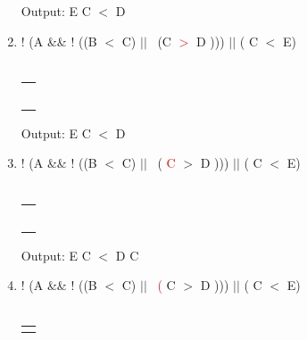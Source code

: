 \documentclass[a4paper]{article}
\begin{document}
\begin{large}
\begin{enumerate}
\begin{tabular}[t]{ | p{1.6em} | }
            \makecell{ $||$ } \\ \hline
          \end{tabular}
          \hspace{2em}
          Output: E C $<$ D
    \item
          ! (A \&\& ! ((B $<$ C) $||$ \ (C  \textcolor{red}{$>$} D ))) $||$ ( C $<$ E)\\
          \\
          \begin{tabular}[t]{ | p{1.6em} | }
            \makecell{ }      \\ \hline
            \makecell{$>$}    \\ \hline
            \makecell{)}      \\ \hline
            \makecell{)}      \\ \hline
            \makecell{)}      \\ \hline
            \makecell{ $||$ } \\ \hline
          \end{tabular}
          \hspace{2em}
          Output: E C $<$ D
    \item
          ! (A \&\& ! ((B $<$ C) $||$ \ (  \textcolor{red}{C} $>$ D ))) $||$ ( C $<$ E)\\
          \\
          \begin{tabular}[t]{ | p{1.6em} | }
            \makecell{ }      \\ \hline
            \makecell{$>$}    \\ \hline
            \makecell{)}      \\ \hline
            \makecell{)}      \\ \hline
            \makecell{)}      \\ \hline
            \makecell{ $||$ } \\ \hline
          \end{tabular}
          \hspace{2em}
          Output: E C $<$ D C
    \item
          ! (A \&\& ! ((B $<$ C) $||$ \ \textcolor{red}{(} C $>$ D ))) $||$ ( C $<$ E)\\
          \\
          \begin{tabular}[t]{ | p{1.6em} | }
            \makecell{ }      \\ \hline
            \makecell{}       \\ \hline

\end{tabular}
\end{enumerate}
\end{large}
\end{document}
